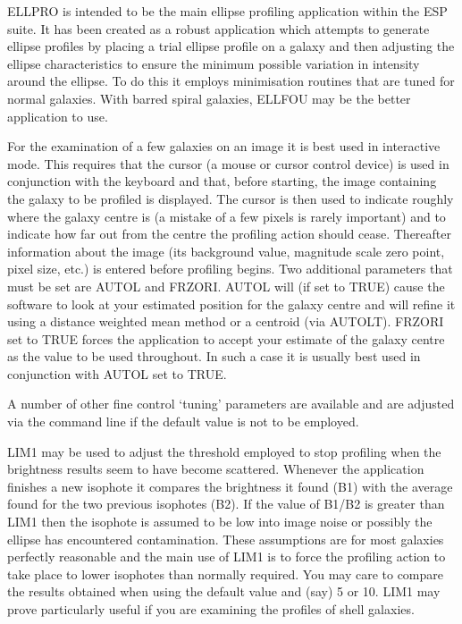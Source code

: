 \documentclass[twoside,11pt]{starlink}
\begin{document}
ELLPRO is intended to be the main ellipse profiling application within the
ESP suite. It has been created as a robust application which attempts to
generate ellipse profiles by placing a trial ellipse profile on a
galaxy and then adjusting the ellipse characteristics to ensure the
minimum possible variation in intensity around the ellipse.
To do this it employs minimisation routines that are
tuned for normal galaxies. With barred spiral galaxies, ELLFOU may be the
better application to use.

For the examination of a few galaxies on an image it is best used in
interactive mode. This requires that the cursor (a mouse or cursor
control device) is used in conjunction with the keyboard and that,
before starting, the image containing the galaxy to be profiled is
displayed. The cursor is then used to indicate roughly where the
galaxy centre is (a mistake of a few pixels is rarely important)
and to indicate how far out from the centre the profiling action
should cease. Thereafter information about the image (its background
value, magnitude scale zero point, pixel size, etc.) is entered
before profiling begins. Two additional parameters that must be set
are AUTOL and FRZORI. AUTOL will (if set to TRUE) cause the software
to look at your estimated position for the galaxy centre and will
refine it using a distance weighted mean method or a centroid (via AUTOLT).
FRZORI set to TRUE forces the application to accept your estimate of
the galaxy centre as the value to be used throughout. In such a case it
is usually best used in conjunction with AUTOL set to TRUE.

A number of other fine control `tuning' parameters are available
and are adjusted via the command line if the default value
is not to be employed.

LIM1 may be used to adjust the threshold employed to stop profiling when
the brightness results seem to have become scattered. Whenever the
application finishes a new isophote it compares the brightness it
found (B1) with the average found for the two previous isophotes (B2).
If the value of  B1/B2 is greater than LIM1 then the isophote is
assumed to be low into image noise or possibly the ellipse has
encountered contamination. These assumptions are for most galaxies
perfectly reasonable and the main use of LIM1 is to force the profiling
action to take place to lower isophotes than normally required. You
may care to compare the results obtained when using the default value and
(say) 5 or 10. LIM1 may prove particularly useful if you are examining
the profiles of shell galaxies.
\end{document}
